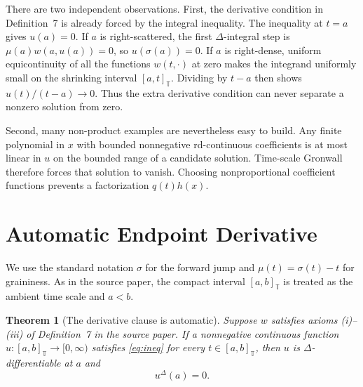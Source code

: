 \documentclass[11pt]{article}
\newtheorem{theorem}{Theorem}
\newcommand{\T}{\mathbb T}
\newcommand{\muT}{\mu}
\begin{document}
There are two independent observations.  First, the derivative condition in
Definition~7 is already forced by the integral inequality.  The inequality at
$t=a$ gives $u(a)=0$.  If $a$ is right-scattered, the first $\Delta$-integral
step is $\muT(a)w(a,u(a))=0$, so $u(\sigma(a))=0$.  If $a$ is right-dense,
uniform equicontinuity of all the functions $w(t,\cdot)$ at zero makes the
integrand uniformly small on the shrinking interval $[a,t]_{\T}$.  Dividing
by $t-a$ then shows $u(t)/(t-a)\to0$.  Thus the extra derivative condition
can never separate a nonzero solution from zero.

Second, many non-product examples are nevertheless easy to build.  Any finite
polynomial in $x$ with bounded nonnegative rd-continuous coefficients is at
most linear in $u$ on the bounded range of a candidate solution.  Time-scale
Gronwall therefore forces that solution to vanish.  Choosing nonproportional
coefficient functions prevents a factorization $q(t)h(x)$.

\section*{Automatic Endpoint Derivative}

We use the standard notation $\sigma$ for the forward jump and
$\muT(t)=\sigma(t)-t$ for graininess.  As in the source paper, the compact
interval $[a,b]_{\T}$ is treated as the ambient time scale and $a<b$.

\begin{theorem}[The derivative clause is automatic]\label{thm:auto}
Suppose $w$ satisfies axioms (i)--(iii) of Definition~7 in the source paper.
If a nonnegative continuous function $u:[a,b]_{\T}\to[0,\infty)$ satisfies
\eqref{eq:ineq} for every $t\in[a,b]_{\T}$, then $u$ is
$\Delta$-differentiable at $a$ and
\[
                              u^\Delta(a)=0.
\]
\end{theorem}
\end{document}
